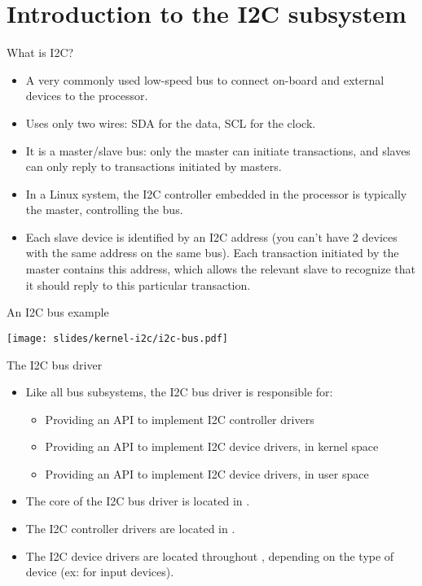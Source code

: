 \section{Introduction to the I2C subsystem}

\begin{frame}{What is I2C?}
  \begin{itemize}
  \item A very commonly used low-speed bus to connect on-board
    and external devices to the processor.
  \item Uses only two wires: SDA for the data, SCL for the clock.
  \item It is a master/slave bus: only the master can initiate
    transactions, and slaves can only reply to transactions initiated
    by masters.
  \item In a Linux system, the I2C controller embedded in the
    processor is typically the master, controlling the bus.
  \item Each slave device is identified by an I2C address (you can't
    have 2 devices with the same address on the same bus). Each transaction
    initiated by the master contains this address, which
    allows the relevant slave to recognize that it should reply to
    this particular transaction.
  \end{itemize}
\end{frame}

\begin{frame}{An I2C bus example}
  \begin{center}
    \texttt{[image: slides/kernel-i2c/i2c-bus.pdf]}
  \end{center}
\end{frame}

\begin{frame}{The I2C bus driver}
  \begin{itemize}
  \item Like all bus subsystems, the I2C bus driver is responsible for:
    \begin{itemize}
    \item Providing an API to implement I2C controller drivers
    \item Providing an API to implement I2C device drivers, in kernel space
    \item Providing an API to implement I2C device drivers, in user space
    \end{itemize}
  \item The core of the I2C bus driver is located in
    .
  \item The I2C controller drivers are located in
    .
  \item The I2C device drivers are located throughout
    , depending on the type of device (ex:
     for input devices).
  \end{itemize}
\end{frame}

